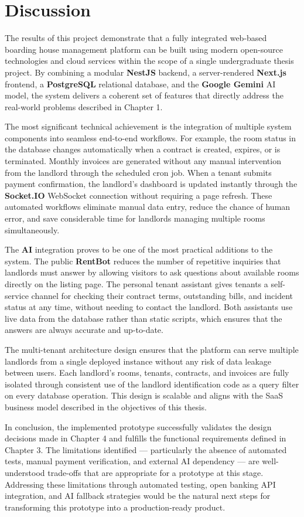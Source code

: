 \section{Discussion}

The results of this project demonstrate that a fully integrated web-based boarding house management platform can be built using modern open-source technologies and cloud services within the scope of a single undergraduate thesis project. By combining a modular \textbf{NestJS} backend, a server-rendered \textbf{Next.js} frontend, a \textbf{PostgreSQL} relational database, and the \textbf{Google Gemini} AI model, the system delivers a coherent set of features that directly address the real-world problems described in Chapter 1.

The most significant technical achievement is the integration of multiple system components into seamless end-to-end workflows. For example, the room status in the database changes automatically when a contract is created, expires, or is terminated. Monthly invoices are generated without any manual intervention from the landlord through the scheduled cron job. When a tenant submits payment confirmation, the landlord's dashboard is updated instantly through the \textbf{Socket.IO} WebSocket connection without requiring a page refresh. These automated workflows eliminate manual data entry, reduce the chance of human error, and save considerable time for landlords managing multiple rooms simultaneously.

The \textbf{AI} integration proves to be one of the most practical additions to the system. The public \textbf{RentBot} reduces the number of repetitive inquiries that landlords must answer by allowing visitors to ask questions about available rooms directly on the listing page. The personal tenant assistant gives tenants a self-service channel for checking their contract terms, outstanding bills, and incident status at any time, without needing to contact the landlord. Both assistants use live data from the database rather than static scripts, which ensures that the answers are always accurate and up-to-date.

The multi-tenant architecture design ensures that the platform can serve multiple landlords from a single deployed instance without any risk of data leakage between users. Each landlord's rooms, tenants, contracts, and invoices are fully isolated through consistent use of the landlord identification code as a query filter on every database operation. This design is scalable and aligns with the SaaS business model described in the objectives of this thesis.

In conclusion, the implemented prototype successfully validates the design decisions made in Chapter 4 and fulfills the functional requirements defined in Chapter 3. The limitations identified — particularly the absence of automated tests, manual payment verification, and external AI dependency — are well-understood trade-offs that are appropriate for a prototype at this stage. Addressing these limitations through automated testing, open banking API integration, and AI fallback strategies would be the natural next steps for transforming this prototype into a production-ready product.
